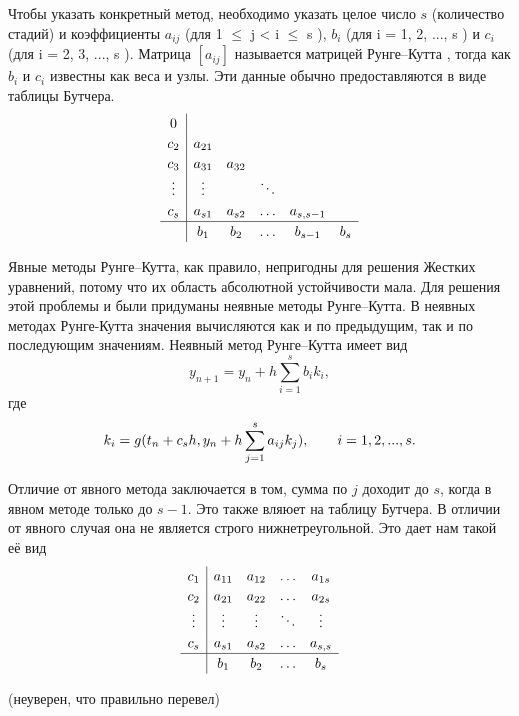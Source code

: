 \documentclass[a4paper,12pt]{article}
\begin{document}
	Чтобы указать конкретный метод, необходимо указать целое число \(s\) (количество стадий) и коэффициенты \(a_{ij}\) (для 1 \(\leq\) j < i \(\leq\) s ), \(b_i\) (для i = 1, 2, ..., s ) и \(c_i\) (для i = 2, 3, ..., s ). Матрица \([a_{ij}]\) называется матрицей Рунге–Кутта , тогда как \(b_i\) и \(c_i\) известны как веса и узлы. Эти данные обычно предоставляются в виде таблицы Бутчера.
	\[
	\renewcommand\arraystretch{1.2}
	\begin{array}
		{c|ccccc}
		0\\
		c_2 &a_{21}\\
		c_3 &a_{31} &a_{32}\\
		\vdots &\vdots & &\ddots\\
		c_s& a_{s1} &a_{s2}& \ldots&a_{s,s-1}\\
		\hline
		& b_1 &b_2 &\ldots &b_{s-1} &b_s
	\end{array}
	\]

	Явные методы Рунге–Кутта, как правило, непригодны для решения Жестких уравнений, потому что их область абсолютной устойчивости мала. Для решения этой проблемы и были придуманы неявные методы Рунге–Кутта. В неявных методах Рунге-Кутта значения вычисляются как и по предыдущим, так и по последующим значениям. Неявный метод Рунге–Кутта имеет вид
	\begin{equation}\label{eq:2} 
		y_{n+1}=y_n+h\sum_{i=1}^{s}b_ik_i,
	\end{equation}
	где
	\begin{equation} 
		k_i=g(t_n+c_sh, y_n+h\sum_{j=1}^{s}a_{ij}k_j),\qquad i=1,2,...,s.\\
	\end{equation}

	Отличие от явного метода заключается в том, сумма по \(j\) доходит до \(s\), когда в явном методе только до \(s-1\). Это также вляюет на таблицу Бутчера. В отличии от явного случая она не является строго нижнетреугольной. Это дает нам такой её вид
	\[
	\renewcommand\arraystretch{1.2}
	\begin{array}
		{c|ccccc}
		c_1 &a_{11} &a_{12} &\ldots &a_{1s}\\
		c_2 &a_{21} &a_{22}&\ldots&a_{2s}\\
		\vdots &\vdots &\vdots &\ddots &\vdots\\
		c_s& a_{s1} &a_{s2} &\ldots &a_{s,s}\\
		\hline
		& b_1 &b_2 &\ldots &b_{s} 
	\end{array}
	\]

	(неуверен, что правильно перевел)
\end{document}
